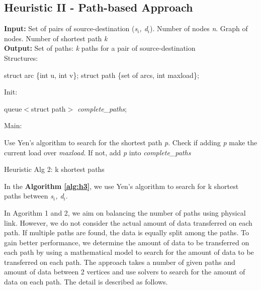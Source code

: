 \subsection{Heuristic II - Path-based Approach}

\begin{algorithm}[!htp]
\textbf{Input:} Set of pairs of source-destination (\textit{s$_i$, d$_i$}). Number of nodes \textit{n}. Graph of nodes. Number of shortest path \textit{k}\\
\textbf{Output:} Set of paths: \textit{k} paths for a pair of source-destination\\
Structures:
    \begin{algorithmic}
        \State struct arc \{int u, int v\};
        \State struct path \{set of arcs, int maxload\};
    \end{algorithmic}

Init:
    \begin{algorithmic}
        \State queue$<$struct path$>$ \textit{complete\_paths};
    \end{algorithmic}
Main:
\begin{algorithmic}
		\State Use Yen's algorithm to search for the shortest path \textit{p}.
		\State Check if adding \textit{p} make the current load over \textit{maxload}.
		\State If not, add \textit{p} into \textit{complete\_paths}
	    \EndWhile
	\EndFor
    \EndFunction
\end{algorithmic}

\caption{Heuristic Alg 2: k shortest paths}
\label{alg:h2}

\end{algorithm}

In the \textbf{Algorithm \ref{alg:h3}}, we use Yen's algorithm to search for k shortest paths between \textit{s$_i$, d$_i$}.

In Agorithm 1 and 2, we aim on balancing the number of paths using physical link. However, we do not consider the actual amount of data transferred on each path. If multiple paths are found, the data is equally split among the paths. To gain better performance, we determine the amount of data to be transferred on each path by using a mathematical model to search for the amount of data to be transferred on each path. The approach takes a number of given paths and amount of data between 2 vertices and use solvers to search for the amount of data on each path. The detail is described as follows.

